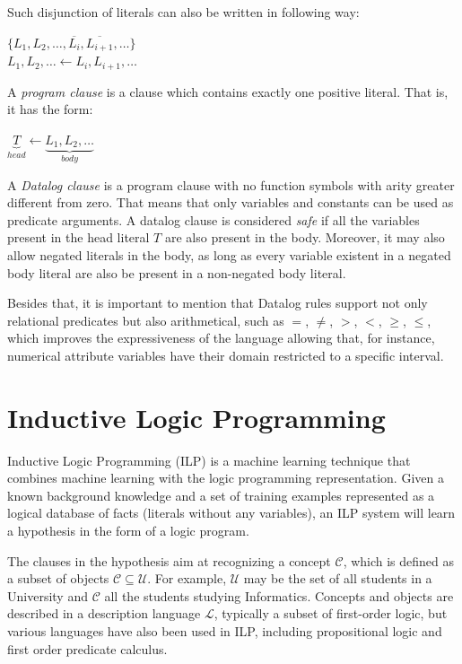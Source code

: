 Such disjunction of literals can also be written in following way:
\begin{center}
 $\{L_1,L_2,\ldots,\overline{L_i},\overline{L_{i+1}},\ldots\}$ \\
$ L_1,L_2,\ldots \leftarrow L_i,L_{i+1},\ldots$
\end{center}

A \emph{program clause} is a clause which contains exactly one positive literal. That is, it has the form:
\begin{center}
 $\underbrace{T}_{head} \leftarrow \underbrace{L_1,L_2,\ldots}_{body}$
\end{center}

A \emph{Datalog clause} is a program clause with no function symbols with arity greater different from zero. That
means that only variables and constants can be used as predicate arguments. A datalog clause is considered \emph{safe}
if all the variables present in the head literal $T$ are also present in the body. Moreover, it may also allow negated
literals in the body, as long as every variable existent in a negated body literal are also be present in a
non-negated body literal.

Besides that, it is important to mention that Datalog rules support not only relational predicates but also
arithmetical, such as $=$, $\neq$, $>$, $<$, $\geq$, $\leq$, which improves the expressiveness of the language
allowing that, for instance, numerical attribute variables have their domain restricted to a specific interval.

\section{Inductive Logic Programming}
\label{sec:rw-ilp}

\cite{DBLP:journals/ml/LavracD96}
Inductive Logic Programming (ILP) is a machine learning technique that combines machine learning with the
logic programming representation. Given a known background knowledge and a set of training examples represented as a
logical database of facts (literals without any variables), an ILP system will learn a hypothesis in the form of a
logic program.

The clauses in the hypothesis aim at recognizing a concept $\mathcal{C}$, which is defined as a subset of objects
$\mathcal{C} \subseteq \mathcal{U}$. For example, $\mathcal{U}$ may be the set of all students in a University and
$\mathcal{C}$ all the students studying Informatics.
Concepts and objects are described in a description language $\mathcal{L}$, typically a subset of first-order logic,
but
various languages have also been used in ILP, including propositional logic and first order predicate calculus.

